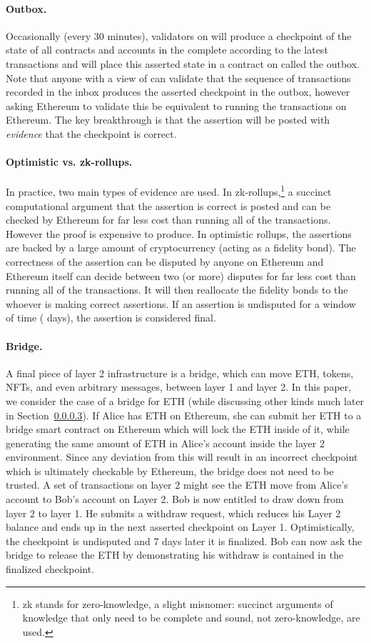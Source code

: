 \paragraph{Outbox.} Occasionally (\eg every 30 minutes), validators on \layertwo will produce a checkpoint of the state of all contracts and accounts in the complete \layertwo according to the latest transactions and will place this asserted state in a contract on \layerone called the outbox. Note that anyone with a view of \layerone can validate that the sequence of transactions recorded in the inbox produces the asserted checkpoint in the outbox, however asking Ethereum to validate this be equivalent to running the transactions on Ethereum. The key breakthrough is that the assertion will be posted with \textit{evidence} that the checkpoint is correct.

\paragraph{Optimistic vs. zk-rollups.} In practice, two main types of evidence are used. In zk-rollups,\footnote{zk stands for zero-knowledge, a slight misnomer: succinct arguments of knowledge that only need to be complete and sound, not zero-knowledge, are used.} a succinct computational argument that the assertion is correct is posted and can be checked by Ethereum for far less cost than running all of the transactions. However the proof is expensive to produce. In optimistic rollups, the assertions are backed by a large amount of cryptocurrency (acting as a fidelity bond). The correctness of the assertion can be disputed by anyone on Ethereum and Ethereum itself can decide between two (or more) disputes for far less cost than running all of the transactions. It will then reallocate the fidelity bonds to the whoever is making correct assertions. If an assertion is undisputed for a window of time ( days), the assertion is considered final.

\paragraph{Bridge.} A final piece of layer 2 infrastructure is a bridge, which can move ETH, tokens, NFTs, and even arbitrary messages, between layer 1 and layer 2. In this paper, we consider the case of a bridge for ETH (while discussing other kinds much later in Section~\ref{}). If Alice has ETH on Ethereum, she can submit her ETH to a bridge smart contract on Ethereum which will lock the ETH inside of it, while generating the same amount of ETH in Alice's account inside the layer 2 environment. Since any deviation from this will result in  an incorrect checkpoint which is ultimately checkable by Ethereum, the bridge does not need to be trusted. A set of transactions on layer 2 might see the ETH move from Alice's account to Bob's account on Layer 2. Bob is now entitled to draw down from layer 2 to layer 1. He submits a withdraw request, which reduces his Layer 2 balance and ends up in the next asserted checkpoint on Layer 1. Optimistically, the checkpoint is undisputed and 7 days later it is finalized. Bob can now ask the bridge to release the ETH by demonstrating his withdraw is contained in the finalized checkpoint.


